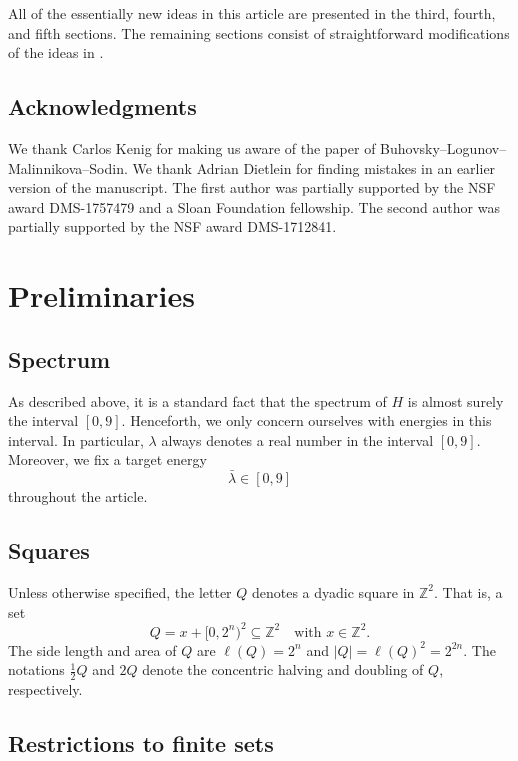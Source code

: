 \documentclass{amsart}
\numberwithin{equation}{section}
\numberwithin{figure}{section}
\newcommand{\Z}{\mathbb{Z}}
\begin{document}
All of the essentially new ideas in this article are presented in the third, fourth, and fifth sections.  The remaining sections consist of straightforward modifications of the ideas in \cite{Bourgain-Kenig}.

\subsection*{Acknowledgments}

We thank Carlos Kenig for making us aware of the paper of Buhovsky--Logunov--Malinnikova--Sodin.  We thank Adrian Dietlein for finding mistakes in an earlier version of the manuscript.  The first author was partially supported by the NSF award DMS-1757479 and a Sloan Foundation fellowship.  The second author was partially supported by the NSF award DMS-1712841.

\section{Preliminaries}

\subsection{Spectrum}

As described above, it is a standard fact that the spectrum of $H$ is almost surely the interval $[0,9]$.  Henceforth, we only concern ourselves with energies in this interval.  In particular, $\lambda$ always denotes a real number in the interval $[0,9]$.  Moreover, we fix a target energy
\begin{equation*}
\bar \lambda \in [0,9]
\end{equation*}
throughout the article.

\subsection{Squares}

Unless otherwise specified, the letter $Q$ denotes a dyadic square in $\Z^2$.  That is, a set
\begin{equation*}
Q = x + [0,2^n)^2 \subseteq \Z^2 \quad \mbox{with } x \in \Z^2.
\end{equation*}
The side length and area of $Q$ are $\ell(Q) = 2^n$ and $|Q| = \ell(Q)^2 = 2^{2n}$.  The notations $\tfrac12 Q$ and $2 Q$ denote the concentric halving and doubling of $Q$, respectively.

\subsection{Restrictions to finite sets}
\end{document}
